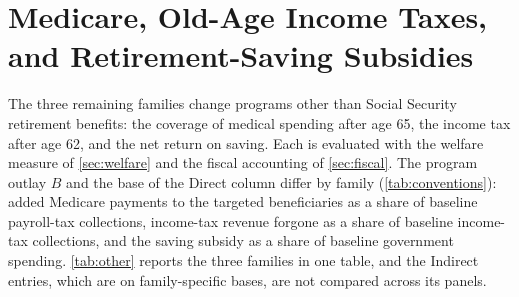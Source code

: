 \providecommand{\cleargradientmacros}{%
  \let\opacity\undefined \let\gradXchange\undefined \let\gradSSpay\undefined \let\gradMVPF\undefined
  \let\gradCost\undefined \let\gradPP\undefined \let\gradMedpay\undefined \let\gradTaxchange\undefined}
\section{Medicare, Old-Age Income Taxes, and Retirement-Saving Subsidies}\label{sec:other}

The three remaining families change programs other than Social Security retirement benefits: the coverage of medical spending after age 65, the income tax after age 62, and the net return on saving. Each is evaluated with the welfare measure of \autoref{sec:welfare} and the fiscal accounting of \autoref{sec:fiscal}. The program outlay $B$ and the base of the Direct column differ by family (\autoref{tab:conventions}): added Medicare payments to the targeted beneficiaries as a share of baseline payroll-tax collections, income-tax revenue forgone as a share of baseline income-tax collections, and the saving subsidy as a share of baseline government spending. \autoref{tab:other} reports the three families in one table, and the Indirect entries, which are on family-specific bases, are not compared across its panels.

